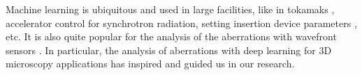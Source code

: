 \documentclass{iucr}
\newcommand{\todo}[1]{{\color{red}[TODO: "#1'']}}
\begin{document}
Machine learning is ubiquitous and used in large facilities, like in tokamaks \cite{Degrave2022-ip}, accelerator control \cite{ML_acc_edelen2020} for synchrotron radiation,  setting insertion device parameters \cite{Sheppard:yi5121}, etc. It is also quite popular for the analysis of the aberrations with wavefront sensors \cite{Nishizaki:19, Mockl2019-sr, Vanberg2019}. 
In particular, the analysis of aberrations with deep learning for 3D microscopy applications \cite{Saha2020} has inspired and guided us in our research.     






\end{document}
